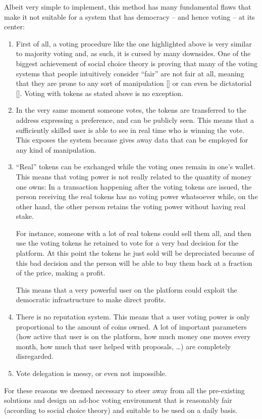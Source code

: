 \documentclass[submission, copyright,creativecommons,sharealike,noncommercial]{eptcs}
\begin{document}
	Albeit very simple to implement, this method has many fundamental flaws that make it not suitable for a system that has democracy -- and hence voting -- at its center:
	\begin{enumerate}
		
		\item First of all, a voting procedure like the one highlighted above is very similar to majority voting and, as such, it is cursed by many downsides. One of the biggest achievement of social choice theory is proving that many of the voting systems that people intuitively consider ``fair'' are not fair at all, meaning that they are prone to any sort of manipulation [] or can even be dictatorial []. Voting with tokens as stated above is no exception. 
		
		\item In the very same moment someone votes, the tokens are transferred to the address expressing a preference, and can be publicly seen. This means that a sufficiently skilled user is able to see in real time who is winning the vote. This exposes the system because gives away data that can be employed for any kind of manipulation.
		
		\item ``Real'' tokens can be exchanged while the voting ones remain in one's wallet. This means that voting power is not really related to the quantity of money one owns: In a transaction happening after the voting tokens are issued, the person receiving the real tokens has no voting power whatsoever while, on the other hand, the other person retains the voting power without having real stake.
		
		For instance, someone with a lot of real tokens could sell them all, and then use the voting tokens he retained to vote for a very bad decision for the platform. At this point the tokens he just sold will be depreciated because of this bad decision and the person will be able to buy them back at a fraction of the price, making a profit. 
		
		This means that a very powerful user on the platform could exploit the democratic infrastructure to make direct profits.
		
		\item There is no reputation system. This means that a user voting power is only proportional to the amount of coins owned. A lot of important parameters (how active that user is on the platform, how much money one moves every month, how much that user helped with proposals, \dots) are completely disregarded.
		
		\item Vote delegation is messy, or even not impossible.
	\end{enumerate}
	For these reasons we deemed necessary to steer away from all the pre-existing solutions and design an ad-hoc voting environment that is reasonably fair (according to social choice theory) and suitable to be used on a daily basis.
\end{document}
